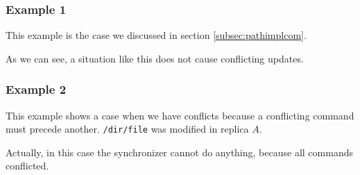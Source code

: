 \subsubsection{Example 1}
This example is the case we discussed in section \ref{subsec:pathimplcom}.
\begin{center}
{\small{
\begin{alltt}\end{alltt}
}}
\end{center}
As we can see, a situation like this does not cause conflicting updates.
\subsubsection{Example 2}
This example shows a case when we have conflicts because a conflicting
command must precede another. \texttt{/dir/file} was modified in replica
\(A\).
\begin{center}
{\small{
\begin{alltt}\end{alltt}
}}
\end{center}
Actually, in this case the synchronizer cannot do anything, because all
commands conflicted.
